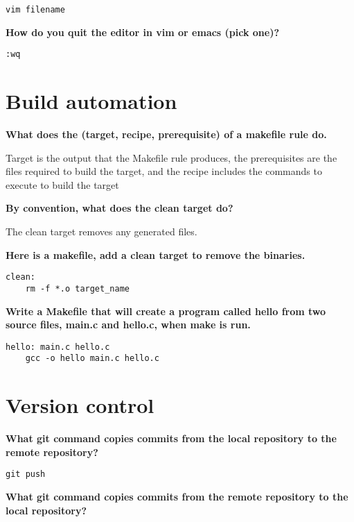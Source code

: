 \documentclass{article}
\begin{document}
\begin{verbatim}
vim filename
\end{verbatim}

\textbf{How do you quit the editor in vim or emacs (pick one)?}

\begin{verbatim}
:wq
\end{verbatim}

\section*{Build automation}
\textbf{What does the (target, recipe, prerequisite) of a makefile rule do.}
\vspace{0.5em}

Target is the output that the Makefile rule produces, the prerequisites are the files required to
build the target, and the recipe includes the commands to execute to build the target

\vspace{1em}
\textbf{By convention, what does the clean target do?}
\vspace{0.5em}

The clean target removes any generated files.

\vspace{1em}
\textbf{Here is a makefile, add a clean target to remove the binaries.}

\begin{verbatim}
clean:
    rm -f *.o target_name
\end{verbatim}

\textbf{Write a Makefile that will create a program called hello from two source files, main.c and
hello.c, when make is run.}

\begin{verbatim}
hello: main.c hello.c
    gcc -o hello main.c hello.c
\end{verbatim}

\section*{Version control}
\textbf{What git command copies commits from the local repository to the remote repository?}

\begin{verbatim}
git push
\end{verbatim}

\textbf{What git command copies commits from the remote repository to the local repository?}
\end{document}
